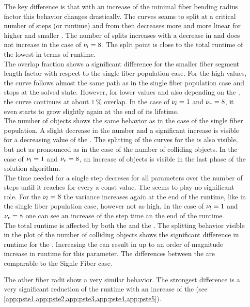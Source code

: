 The key difference is that with an increase of the minimal fiber bending radius factor \segRadiusFactor{} this behavior changes drastically.
The curves seams to split at a critical number of steps (or runtime) and from then decreases more and more linear for higher \segRadiusFactor{} and smaller \segLengthFactor{}.
The number of splits increases with a decrease in \segLengthFactor{} and does not increase in the case of $\textnormal{$\nu_{l}$} = \SI{8}{}$.
The split point is close to the total runtime of the lowest \segRadiusFactor{} in terms of runtime.
\\
% 
The overlap fraction shows a significant difference for the smaller fiber segment length factor \segLengthFactor{} with respect to the single fiber population case.
For the high \segLengthFactor{} values, the curve follows almost the same path as in the single fiber population case and stops at the solved state.
However, for lower values and also depending on the \segRadius{}, the curve continues at about $\SI{1}{\percent}$ overlap.
In the case of $\textnormal{$\nu_{l}$} = \SI{1}{}$ and $\textnormal{$\nu_{r}$} = \SI{8}{}$, it even starts to grow slightly again at the end of its lifetime.
\\
% 
The number of objects shows the same behavior as in the case of the single fiber population. 
A slight decrease in the number and a significant increase is visible for a decreasing value of the \segLengthFactor{}.
The splitting of the curves for the \segRadiusFactor{} is also visible, but not as pronounced as in the case of the number of colliding objects.
In the case of $\textnormal{$\nu_{l}$} = \SI{1}{}$ and $\textnormal{$\nu_{r}$} = \SI{8}{}$, an increase of objects is visible in the last phase of the solution algorithm.
\\
The time needed for a single step decreses for all parameters over the number of steps until it reaches for every \segLengthFactor{} a const value.
The \segRadiusFactor{} seems to play no significant role.
For the $\textnormal{$\nu_{l}$}{} = \SI{8}{}$ the variance increases again at the end of the runtime, like in the single fiber population case, however not as high.
In the case of $\textnormal{$\nu_{l}$}{} = \SI{1}{}$ and $\textnormal{$\nu_{r}$} = \SI{8}{}$ one can see an increase of the step time an the end of the runtime.
\\
% 
The total runtime is affected by both the \segLengthFactor{} and the \segRadiusFactor{}.
The splitting behavior visible in the plot of the number of colliding objects shows the significant difference in runtime for the \segRadiusFactor{}.
Increasing the \segRadiusFactor{} can result in up to an order of magnitude increase in runtime for this parameter.
The differences between the \segLengthFactor{} are comparable to the Signle Fiber case.
\par
%
The other fiber radii show a very similar behavior.
The strongest difference is a very significant reduction of the runtime with an increase of the \fiberRadiusMean{} (see \cref{app:pste1,app:pste2,app:pste3,app:pste4,app:pste5}).
% 
% 
% 
